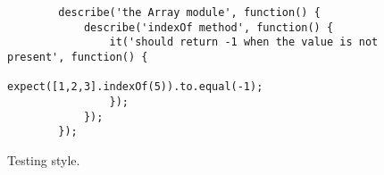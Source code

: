 \begin{figure}[H]
	\centering
	\begin{lstlisting}
		describe('the Array module', function() {
			describe('indexOf method', function() {
				it('should return -1 when the value is not present', function() {
					expect([1,2,3].indexOf(5)).to.equal(-1);
				});
			});
		});
	\end{lstlisting}
	\caption[Testing style]{Testing style.}
	\label{fig:testing_style}
\end{figure}
